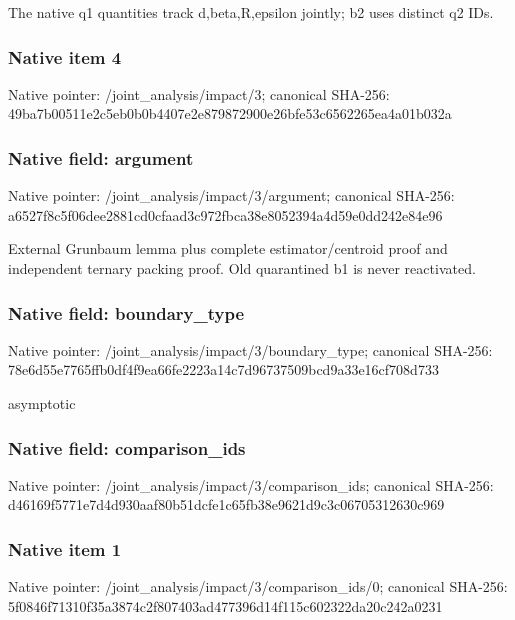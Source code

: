 \documentclass[10pt,a4paper]{article}
\begin{document}
The native q1 quantities track d,beta,R,epsilon jointly; b2 uses distinct q2 IDs.


\subsubsection{Native item 4}


Native pointer: /joint\_analysis/impact/3; canonical SHA-256: 49ba7b00511e2c5eb0b0b440\allowbreak{}7e2e879872900e26bfe53c65\allowbreak{}62265ea4a01b032a



\subsubsection{Native field: argument}


Native pointer: /joint\_analysis/impact/3/argument; canonical SHA-256: a6527f8c5f06dee2881cd0cf\allowbreak{}aad3c972fbca38e8052394a4\allowbreak{}d59e0dd242e84e96


External Grunbaum lemma plus complete estimator/centroid proof and independent ternary packing proof. Old quarantined b1 is never reactivated.


\subsubsection{Native field: boundary\_type}


Native pointer: /joint\_analysis/impact/3/boundary\_type; canonical SHA-256: 78e6d55e7765ffb0df4f9ea6\allowbreak{}6fe2223a14c7d96737509bcd\allowbreak{}9a33e16cf708d733


asymptotic


\subsubsection{Native field: comparison\_ids}


Native pointer: /joint\_analysis/impact/3/comparison\_ids; canonical SHA-256: d46169f5771e7d4d930aaf80\allowbreak{}b51dcfe1c65fb38e9621d9c3\allowbreak{}c06705312630c969



\subsubsection{Native item 1}


Native pointer: /joint\_analysis/impact/3\allowbreak{}/comparison\_ids/0; canonical SHA-256: 5f0846f71310f35a3874c2f8\allowbreak{}07403ad477396d14f115c602\allowbreak{}322da20c242a0231
\end{document}
